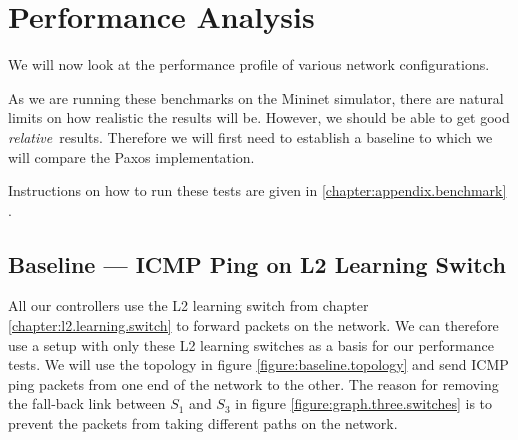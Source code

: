 \chapter{Performance Analysis}
\label{chapter:analysis}

We will now look at the performance profile of various network
configurations.

As we are running these benchmarks on the Mininet simulator, there
are natural limits on how realistic the results will be.  However, we should
be able to get good \textit{relative} results.   Therefore we will first
need to establish a baseline to which we will compare the
Paxos implementation.

Instructions on how to run these tests are given in
\ref{chapter:appendix.benchmark} .

\section{Baseline --- ICMP Ping on L2 Learning Switch}
\label{chapter:baseline.benchmark}

All our controllers use the L2 learning switch
from chapter \ref{chapter:l2.learning.switch} to forward packets on the
network.
%
We can therefore use a setup with only these L2 learning switches
as a basis for our performance tests.
%
We will use the topology in figure
\ref{figure:baseline.topology} and send \ac{ICMP} ping packets from one end of
the network to the other.
%
The reason for removing the fall-back link between $S_1$ and $S_3$ in figure
\ref{figure:graph.three.switches} is to prevent the packets from taking
different paths on the network.

